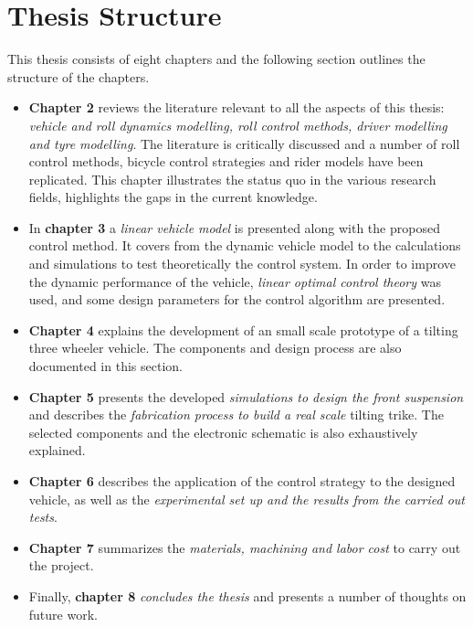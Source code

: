\newpage
\section{Thesis Structure}

This thesis consists of eight chapters and the following section outlines the structure of the chapters. 
\begin{itemize}\itemsep -8pt
	\begin{itemize}
\item \textbf{Chapter 2} reviews the literature relevant to all the aspects of this thesis: \textit{vehicle and roll dynamics modelling, roll control methods, driver modelling and tyre modelling}. The literature is critically discussed and a number of roll control methods, bicycle control strategies and rider models have been replicated. This chapter illustrates the status quo in the various research fields, highlights the gaps in the current knowledge. 

\item In \textbf{chapter 3} a \textit{linear vehicle model} is presented along with the proposed control method. It covers from the dynamic vehicle model to the calculations and simulations to test theoretically the control system. In order to improve the dynamic performance of the vehicle, \textit{linear optimal control theory} was used, and some design parameters for the control algorithm are presented.

\item \textbf{Chapter 4} explains the development of an small scale prototype of a tilting three wheeler vehicle. The components and design process are also documented in this section. 

\item \textbf{Chapter 5} presents the developed \textit{simulations to design the front suspension} and describes the \textit{fabrication process to build a real scale }tilting trike. The selected components and the electronic schematic is also exhaustively explained.

\item \textbf{Chapter 6} describes the application of the control strategy to the designed vehicle, as well as the \textit{experimental set up and the results from the carried out tests}. 

\item\textbf{Chapter 7} summarizes the \textit{materials, machining and labor cost} to carry out the project. 

\item Finally, \textbf{chapter 8} \textit{concludes the thesis} and presents a number of thoughts on future work.

	\end{itemize}
\end{itemize}
